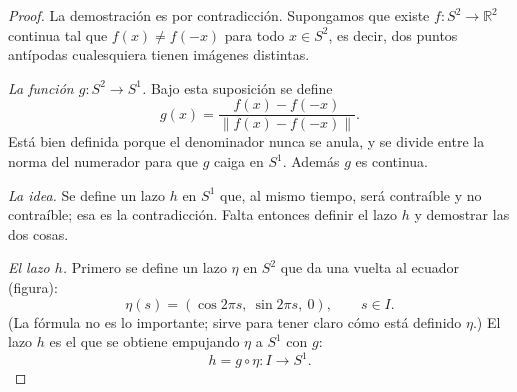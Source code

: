 \documentclass[11pt]{article}
\begin{document}
\begin{proof}
La demostración es por contradicción. Supongamos que existe $f\colon S^2\to\mathbb{R}^2$ continua tal que $f(x)\neq f(-x)$ para todo $x\in S^2$, es decir, dos puntos antípodas cualesquiera tienen imágenes distintas.

\medskip\noindent\textit{La función $g\colon S^2\to S^1$.}
Bajo esta suposición se define
\[
  g(x)=\frac{f(x)-f(-x)}{\lVert f(x)-f(-x)\rVert}.
\]
Está bien definida porque el denominador nunca se anula, y se divide entre la norma del numerador para que $g$ caiga en $S^1$. Además $g$ es continua.

\medskip\noindent\textit{La idea.}
Se define un lazo $h$ en $S^1$ que, al mismo tiempo, será contraíble y no contraíble; esa es la contradicción. Falta entonces definir el lazo $h$ y demostrar las dos cosas.

\medskip\noindent\textit{El lazo $h$.}
Primero se define un lazo $\eta$ en $S^2$ que da una vuelta al ecuador (figura):
\[
  \eta(s)=(\cos 2\pi s,\ \sin 2\pi s,\ 0),\qquad s\in I.
\]
(La fórmula no es lo importante; sirve para tener claro cómo está definido $\eta$.) El lazo $h$ es el que se obtiene empujando $\eta$ a $S^1$ con $g$:
\[
  h=g\circ\eta\colon I\to S^1.
\]


\end{proof}
\end{document}
